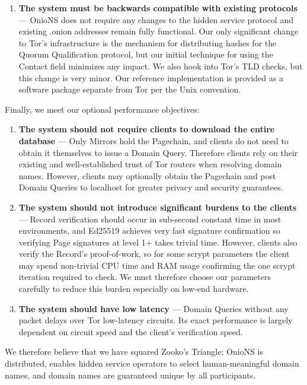 \begin{enumerate}
	\item \textbf{The system must be backwards compatible with existing protocols} --- OnioNS does not require any changes to the hidden service protocol and existing .onion addresses remain fully functional. Our only significant change to Tor's infrastructure is the mechanism for distributing hashes for the Quorum Qualification protocol, but our initial technique for using the Contact field minimizes any impact. We also hook into Tor's TLD checks, but this change is very minor. Our reference implementation is provided as a software package separate from Tor per the Unix convention.
\end{enumerate}

Finally, we meet our optional performance objectives:

\begin{enumerate}
	\item \textbf{The system should not require clients to download the entire database} --- Only Mirrors hold the Pagechain, and clients do not need to obtain it themselves to issue a Domain Query. Therefore clients rely on their existing and well-established trust of Tor routers when resolving domain names. However, clients may optionally obtain the Pagechain and post Domain Queries to localhost for greater privacy and security guarantees.
	\item \textbf{The system should not introduce significant burdens to the clients} --- Record verification should occur in sub-second constant time in most environments, and Ed25519 achieves very fast signature confirmation so verifying Page signatures at level 1+ takes trivial time. However, clients also verify the Record's proof-of-work, so for some scrypt parameters the client may spend non-trivial CPU time and RAM usage confirming the one scrypt iteration required to check. We must therefore choose our parameters carefully to reduce this burden especially on low-end hardware.
	\item \textbf{The system should have low latency} --- Domain Queries without any packet delays over Tor low-latency circuits. Its exact performance is largely dependent on circuit speed and the client's verification speed.
\end{enumerate}

We therefore believe that we have squared Zooko's Triangle; OnioNS is distributed, enables hidden service operators to select human-meaningful domain names, and domain names are guaranteed unique by all participants.


